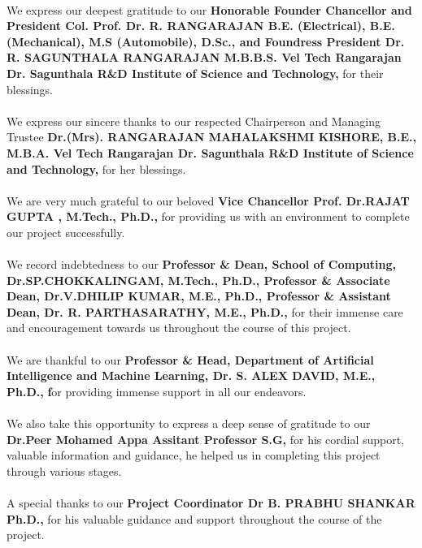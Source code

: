 \documentclass[10pt]{report}
\begin{document}
\begin{sloppypar}

\large{\paragraph{}We express our deepest gratitude to our \textbf{Honorable Founder Chancellor and President
Col. Prof. Dr. R. RANGARAJAN B.E. (Electrical), B.E. (Mechanical), M.S
(Automobile), D.Sc., and Foundress President Dr. R. SAGUNTHALA RANGARAJAN
M.B.B.S. Vel Tech Rangarajan Dr. Sagunthala
R\&D Institute of Science and Technology,} for their blessings.
\large{\paragraph{}We express our sincere thanks to our respected Chairperson and Managing Trustee \textbf{Dr.(Mrs).
RANGARAJAN MAHALAKSHMI KISHORE, B.E., M.B.A. Vel Tech Rangarajan Dr. Sagunthala
R\&D Institute of Science and Technology,} for her blessings. 

\large{\paragraph{}We are very much grateful to our beloved \textbf{Vice Chancellor Prof. Dr.RAJAT
GUPTA , M.Tech., Ph.D.,} for providing us with an environment to complete our project successfully.}
\large{\paragraph{}We record indebtedness to our \textbf{Professor \& Dean, School of Computing, Dr.SP.CHOKKALINGAM, M.Tech., Ph.D., Professor \& Associate Dean,  Dr.V.DHILIP KUMAR, M.E., Ph.D., Professor \& Assistant Dean, Dr. R. PARTHASARATHY, M.E., Ph.D., }  for their immense care and encouragement
towards us throughout the course of this project.}

\large{\paragraph{}We are thankful to our \textbf{Professor \& Head, Department of Artificial Intelligence and Machine Learning, Dr. S. ALEX DAVID, M.E., Ph.D.,} \textbf for providing immense support in all our endeavors.
\large{\paragraph{}We also take this opportunity to express a deep sense of gratitude to our \textbf{Dr.Peer Mohamed Appa Assitant Professor S.G,} for his cordial support, valuable
information and guidance, he helped us in completing this project through various stages. }
\large{\paragraph{}A special thanks to our \textbf{Project Coordinator Dr B. PRABHU SHANKAR Ph.D.,} for his valuable guidance and support throughout the course of the project.}

}}}
\end{sloppypar}
\end{document}
